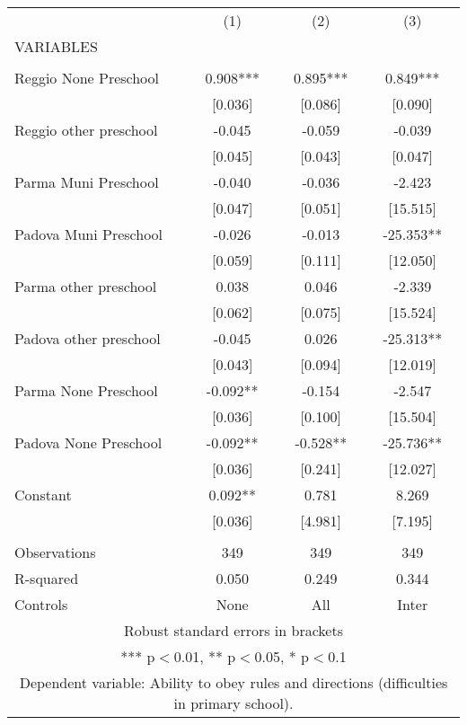 \begin{tabular}{lccc} \hline
 & (1) & (2) & (3) \\
VARIABLES &  &  &  \\ \hline
 &  &  &  \\
Reggio None Preschool & 0.908*** & 0.895*** & 0.849*** \\
 & [0.036] & [0.086] & [0.090] \\
Reggio other preschool & -0.045 & -0.059 & -0.039 \\
 & [0.045] & [0.043] & [0.047] \\
Parma Muni Preschool & -0.040 & -0.036 & -2.423 \\
 & [0.047] & [0.051] & [15.515] \\
Padova Muni Preschool & -0.026 & -0.013 & -25.353** \\
 & [0.059] & [0.111] & [12.050] \\
Parma other preschool & 0.038 & 0.046 & -2.339 \\
 & [0.062] & [0.075] & [15.524] \\
Padova other preschool & -0.045 & 0.026 & -25.313** \\
 & [0.043] & [0.094] & [12.019] \\
Parma None Preschool & -0.092** & -0.154 & -2.547 \\
 & [0.036] & [0.100] & [15.504] \\
Padova None Preschool & -0.092** & -0.528** & -25.736** \\
 & [0.036] & [0.241] & [12.027] \\
Constant & 0.092** & 0.781 & 8.269 \\
 & [0.036] & [4.981] & [7.195] \\
 &  &  &  \\
Observations & 349 & 349 & 349 \\
R-squared & 0.050 & 0.249 & 0.344 \\
 Controls & None & All & Inter \\ \hline
\multicolumn{4}{c}{ Robust standard errors in brackets} \\
\multicolumn{4}{c}{ *** p$<$0.01, ** p$<$0.05, * p$<$0.1} \\
\multicolumn{4}{c}{ Dependent variable: Ability to obey rules and directions (difficulties in primary school).} \\
\end{tabular}
